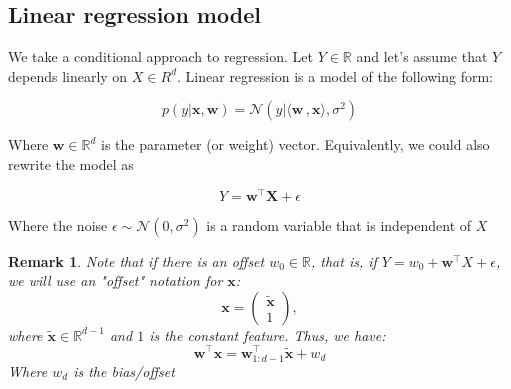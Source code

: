 \documentclass[12pt]{report}
\def\R{\mathbb{R}}
\newcommand{\defobj}[1]{\color{red}#1\color{black}{}}
\renewcommand{\emph}[1]{\color{violet}#1\color{black}{}}
\def\XX{\mathbf{X}}
\def\wb{\mathbf{w}}
\def\xb{\mathbf{x}}
\def\ts{\top}
\newcommand{\normal}{\mathcal{N}}
\newtheorem{remark}{Remark}[section]
\begin{document}
\subsection{Linear regression model}


We take a conditional approach to regression. Let $Y \in \R$ and let's assume that $Y$ depends linearly on $X \in R^d$. Linear regression
is a model of the following form:

\[
    p(y | \xb, \wb) = \normal(y | \langle \wb \,, \xb \rangle, \sigma^2)
\]

Where $\wb \in \R^d$ is the \defobj{parameter} (or \defobj{weight}) vector. Equivalently, we could also rewrite the model as

\[
    Y = \wb^{\ts} \XX + \epsilon
\]

Where the \defobj{noise} $\epsilon \sim \normal(0, \sigma^2)$ is a random variable that is independent of $X$

\begin{remark}
     Note that if there is an offset $w_0\in\R$, that is, if $Y = w_0+{\wb}^{\ts}X+\epsilon$,
     we will use an "offset" notation for $\xb$:  $$\xb = \begin{pmatrix}\tilde{\xb}\\1\end{pmatrix},$$ where
     $\tilde{\xb} \in \R^{d-1}$ and $1$ is the \defobj{constant feature}. Thus, we have:
     $$\wb^{\ts}\xb = \wb_{1:d-1}^{\ts}\tilde{\xb} + w_d$$ Where $w_d$ is the \emph{bias/offset}
 \end{remark}
\end{document}
